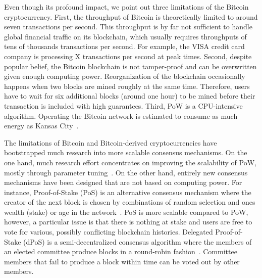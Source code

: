 Even though its profound impact, we point out three limitations of the Bitcoin cryptocurrency.
First, the throughput of Bitcoin is theoretically limited to around seven transactions per second.
This throughput is by far not sufficient to handle global financial traffic on its blockchain, which usually requires throughputs of tens of thousands transactions per second.
For example, the VISA credit card company is processing X transactions per second at peak times.
Second, despite popular belief, the Bitcoin blockchain is not tamper-proof and can be overwritten given enough computing power.
Reorganization of the blockchain occasionally happens when two blocks are mined roughly at the same time.
Therefore, users have to wait for six additional blocks (around one hour) to be mined before their transaction is included with high guarantees.
Third, PoW is a CPU-intensive algorithm.
Operating the Bitcoin network is estimated to consume as much energy as Kansas City~\cite{stoll2019carbon}.

The limitations of Bitcoin and Bitcoin-derived cryptocurrencies have bootstrapped much research into more scalable consensus mechanisms.
On the one hand, much research effort concentrates on improving the scalability of PoW, mostly through parameter tuning~\cite{karame2016security}.
On the other hand, entirely new consensus mechanisms have been designed that are not based on computing power.
For instance, Proof-of-Stake (PoS) is an alternative consensus mechanism where the creator of the next block is chosen by combinations of random selection and ones wealth (stake) or age in the network~\cite{king2012ppcoin}.
PoS is more scalable compared to PoW, however, a particular issue is that there is nothing at stake and users are free to vote for various, possibly conflicting blockchain histories.
Delegated Proof-of-Stake (dPoS) is a semi-decentralized consensus algorithm where the members of an elected committee produce blocks in a round-robin fashion~\cite{larimer2014delegated}.
Committee members that fail to produce a block within time can be voted out by other members.

